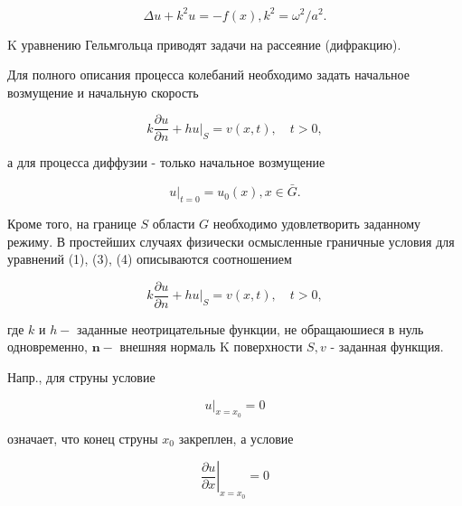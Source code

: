 \documentclass[10pt]{article}
\begin{document}
\[

\Delta u+k^{2} u=-f(x), k^{2}=\omega^{2} / a^{2} .

\]



$\mathrm{K}$ уравнению Гельмгольца приводят задачи на рассеяние (дифракцию).



Для полного описания процесса колебаний необходимо задать начальное возмущение и начальную скорость



\[

k \frac{\partial u}{\partial n}+\left.h u\right|_{S}=v(x, t), \quad t>0,

\]



а для процесса диффузии - только начальное возмущение



\[

\left.u\right|_{t=0}=u_{0}(x), x \in \bar{G} .

\]



Кроме того, на границе $S$ области $G$ необходимо удовлетворить заданному режиму. В простейших случаях физически осмысленные граничные условия для уравнений (1), (3), (4) описываются соотношением



\[

k \frac{\partial u}{\partial n}+\left.h u\right|_{S}=v(x, t), \quad t>0,

\]



где $k$ и $h-$ заданные неотрицательные функции, не обращаюшиеся в нуль одновременно, $\boldsymbol{n}-$ внешняя нормаль $\mathrm{K}$ поверхности $S, v$ - заданная функщия.



Напр., для струны условие



\[

\left.u\right|_{x=x_{0}}=0

\]



означает, что конец струны $x_{0}$ закреплен, а условие



\[

\left.\frac{\partial u}{\partial x}\right|_{x=x_{0}}=0

\]
\end{document}
